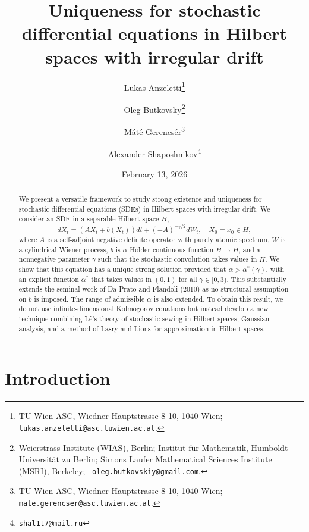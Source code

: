 \documentclass[11pt,a4paper]{article}
\author{Lukas Anzeletti\footnote{TU Wien ASC, Wiedner Hauptstrasse 8-10, 1040 Wien;   \texttt{lukas.anzeletti@asc.tuwien.ac.at}.} \and \setcounter{footnote}{3}
Oleg Butkovsky\footnote{Weierstrass Institute (WIAS), Berlin; 
Institut f\"ur Mathematik, Humboldt-Universit\"at zu Berlin; Simons Laufer Mathematical Sciences Institute (MSRI), Berkeley;~   \texttt{oleg.butkovskiy@gmail.com}.} \and
M\'at\'e Gerencs\'er\footnote{TU Wien ASC, Wiedner Hauptstrasse 8-10, 1040 Wien;~   \texttt{mate.gerencser@asc.tuwien.ac.at}.}\and
Alexander Shaposhnikov\footnote{\texttt{shal1t7@mail.ru}}
}
\title{Uniqueness for stochastic differential equations in Hilbert spaces with irregular drift}
\newcommand{\Op}{A}
\numberwithin{equation}{section}
\theoremstyle{definition}
\theoremstyle{remark}
\theoremstyle{plain}
\begin{document}
\date{February 13, 2026}
\maketitle



\begin{abstract}
We  present a versatile  framework to study strong existence and uniqueness for stochastic differential equations (SDEs) in Hilbert spaces with irregular drift. We consider an SDE in a separable Hilbert space $H$,
\begin{equation*}
dX_t= (\Op X_t + b(X_t))dt +(-\Op)^{-\gamma/2}dW_t,\quad X_0=x_0 \in H,
\end{equation*}
where $A$ is a self-adjoint negative definite operator with purely atomic spectrum, $W$ is a cylindrical Wiener process, $b$ is $\alpha$-H\"older continuous
function $H\to H$, and a nonnegative parameter $\gamma$  such that the stochastic convolution takes values in $H$. We show that this equation has a unique strong solution  provided that  $\alpha > \alpha^*(\gamma)$, with an explicit function $\alpha^*$ that takes values in $(0,1)$ for all $\gamma\in[0,3)$. This substantially extends the seminal work of Da Prato and Flandoli (2010) as no structural assumption on $b$ is imposed. The range of admissible $\alpha$ is also extended. To obtain this result, we do not use infinite-dimensional Kolmogorov equations but instead develop a new technique combining L\^e's theory of stochastic sewing in Hilbert spaces, Gaussian analysis, and a method of Lasry and Lions for approximation in Hilbert spaces.
\end{abstract}

\setcounter{tocdepth}{2}
\renewcommand\contentsname{}
\vspace{-1cm}

\tableofcontents



\section{Introduction}
\end{document}
